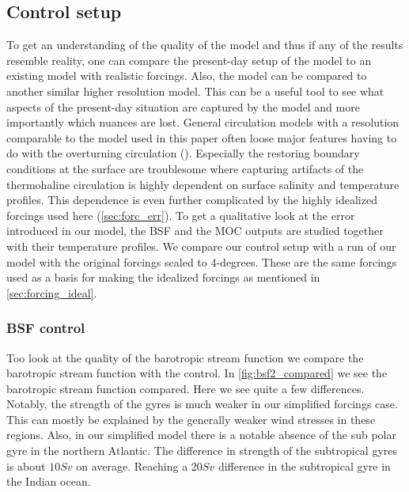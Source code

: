 \subsection{Control setup}


To get an understanding of the quality of the model and thus if any of the results resemble reality, one can compare the present-day setup of the model to an existing model with realistic forcings. Also, the model can be compared to another similar higher resolution model. This can be a useful tool to see what aspects of the present-day situation are captured by the model and more importantly which nuances are lost. General circulation models with a resolution comparable to the model used in this paper often loose major features having to do with the overturning circulation (\cite{stone1990limitations}). Especially the restoring boundary conditions at the surface are troublesome where capturing artifacts of the thermohaline circulation is highly dependent on surface salinity and temperature profiles. This dependence is even further complicated by the highly idealized forcings used here (\cref{sec:forc_err}). To get a qualitative look at the error introduced in our model, the BSF and the MOC outputs are studied together with their temperature profiles. We compare our control setup with a run of our model with the original \cite{ECMWFForc} forcings scaled to 4-degrees. These are the same forcings used as a basis for making the idealized forcings as mentioned in \cref{sec:forcing_ideal}.

\subsubsection{BSF control}
Too look at the quality of the barotropic stream function we compare the barotropic stream function with the control. In \cref{fig:bsf2_compared} we see the barotropic stream function compared. Here we see quite a few differences. Notably, the strength of the gyres is much weaker in our simplified forcings case. This can mostly be explained by the generally weaker wind stresses in these regions. Also, in our simplified model there is a notable absence of the sub polar gyre in the northern Atlantic. The difference in strength of the subtropical gyres is about $10Sv$ on average. Reaching a $20 Sv$ difference in the subtropical gyre in the Indian ocean. 




